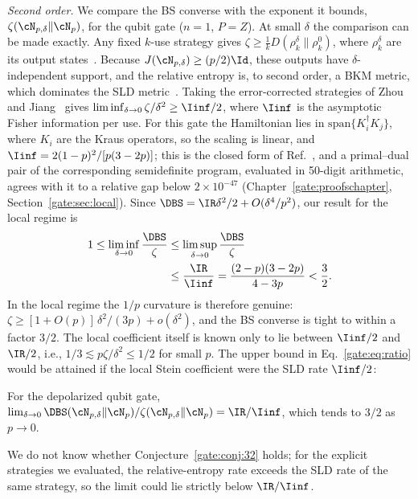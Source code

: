\emph{Second order.} We compare the BS converse with the exponent it bounds, $\zeta(\cN_{p,\delta}\|\cN_p)$, for the qubit gate ($n=1$, $P=Z$). At small $\delta$ the comparison can be made exactly. Any fixed $k$-use strategy gives $\zeta\ge\frac1kD(\rho_k^\delta\|\rho_k^0)$, where $\rho_k^\delta$ are its output states~\cite{WangWilde2019,FFRS2020}. Because $J(\cN_{p,\delta})\ge(p/2)\Id$, these outputs have $\delta$-independent support, and the relative entropy is, to second order, a BKM metric, which dominates the SLD metric~\cite{Petz1996}. Taking the error-corrected strategies of Zhou and Jiang~\cite{ZhouJiang2021} gives $\liminf_{\delta\to0}\zeta/\delta^2\ge\Iinf/2$, where $\Iinf$ is the asymptotic Fisher information per use. For this gate the Hamiltonian lies in $\mathrm{span}\{K_i^\dagger K_j\}$, where $K_i$ are the Kraus operators, so the scaling is linear, and $\Iinf=2(1-p)^2/[p(3-2p)]$; this is the closed form of Ref.~\cite{ZhouJiang2021}, and a primal--dual pair of the corresponding semidefinite program, evaluated in 50-digit arithmetic, agrees with it to a relative gap below $2\times10^{-47}$ (Chapter~\ref{gate:proofschapter}, Section~\ref{gate:sec:local}). Since $\DBS=\IR\delta^2/2+O(\delta^4/p^2)$, our result for the local regime is
\begin{equation}\label{gate:eq:ratio}
\begin{split}
1\le\liminf_{\delta\to0}\frac{\DBS}{\zeta}&\le\limsup_{\delta\to0}\frac{\DBS}{\zeta}\\
&\le\frac{\IR}{\Iinf}=\frac{(2-p)(3-2p)}{4-3p}<\frac32 .
\end{split}
\end{equation}
In the local regime the $1/p$ curvature is therefore genuine: $\zeta\ge[1+O(p)]\,\delta^2/(3p)+o(\delta^2)$, and the BS converse is tight to within a factor $3/2$. The local coefficient itself is known only to lie between $\Iinf/2$ and $\IR/2$, i.e., $1/3\lesssim p\zeta/\delta^2\le1/2$ for small $p$. The upper bound in Eq.~\eqref{gate:eq:ratio} would be attained if the local Stein coefficient were the SLD rate $\Iinf/2$:

\begin{conjecture}\label{gate:conj:32}
For the depolarized qubit gate, $\lim_{\delta\to0}\DBS(\cN_{p,\delta}\|\cN_p)/\zeta(\cN_{p,\delta}\|\cN_p)=\IR/\Iinf$, which tends to $3/2$ as $p\to0$.
\end{conjecture}

We do not know whether Conjecture~\ref{gate:conj:32} holds; for the explicit strategies we evaluated, the relative-entropy rate exceeds the SLD rate of the same strategy, so the limit could lie strictly below $\IR/\Iinf$.

